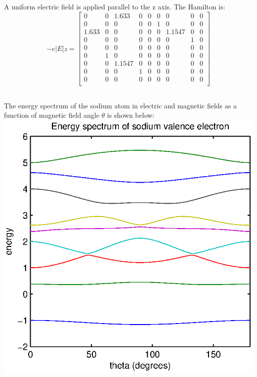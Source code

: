 \documentclass[a4paper,12pt]{article}
\numberwithin{equation}{section}
\begin{document}
\subsection{}
A uniform electric field is applied parallel to the z axis.
The Hamilton is:
\begin{equation}
-e|E|z=
\begin{bmatrix}
 0 & 0 & 1.633 & 0 & 0 & 0 & 0 & 0 & 0 \\
 0 & 0 & 0 & 0 & 0 & 1 & 0 & 0 & 0 \\
 1.633 & 0 & 0 & 0 & 0 & 0 & 1.1547 & 0 & 0 \\
 0 & 0 & 0 & 0 & 0 & 0 & 0 & 1 & 0 \\
 0 & 0 & 0 & 0 & 0 & 0 & 0 & 0 & 0 \\
 0 & 1 & 0 & 0 & 0 & 0 & 0 & 0 & 0 \\
 0 & 0 & 1.1547 & 0 & 0 & 0 & 0 & 0 & 0 \\
 0 & 0 & 0 & 1 & 0 & 0 & 0 & 0 & 0 \\
 0 & 0 & 0 & 0 & 0 & 0 & 0 & 0 & 0 \\
\end{bmatrix}
\end{equation}

\subsection{}
The energy spectrum of the sodium atom in electric and magnetic fields as a function of magnetic field angle $\theta$ is shown below:\\
\includegraphics{Na_spectrum}
\\
\end{document}
